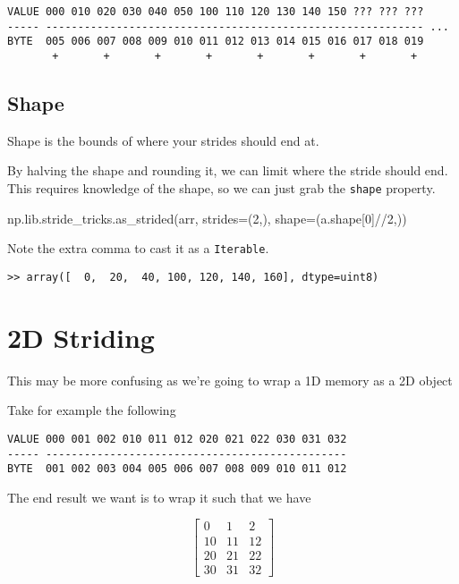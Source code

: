 \documentclass[oneside, 12pt]{report}
\begin{document}
\begin{verbatim}
VALUE 000 010 020 030 040 050 100 110 120 130 140 150 ??? ??? ??? 
----- ----------------------------------------------------------- ...
BYTE  005 006 007 008 009 010 011 012 013 014 015 016 017 018 019
       +       +       +       +       +       +       +       +
\end{verbatim}

\subsection{Shape}

Shape is the bounds of where your strides should end at.

By halving the shape and rounding it, we can limit where the stride should end. This requires knowledge of the shape, so we can just grab the \verb+shape+ property.

\begin{python}
np.lib.stride_tricks.as_strided(arr, strides=(2,), shape=(a.shape[0]//2,))
\end{python}

Note the extra comma to cast it as a \verb+Iterable+.

\begin{verbatim}
>> array([  0,  20,  40, 100, 120, 140, 160], dtype=uint8)
\end{verbatim}

\section{2D Striding}

This may be more confusing as we're going to wrap a 1D memory as a 2D object

Take for example the following

\begin{verbatim}
VALUE 000 001 002 010 011 012 020 021 022 030 031 032
----- -----------------------------------------------
BYTE  001 002 003 004 005 006 007 008 009 010 011 012
\end{verbatim}

The end result we want is to wrap it such that we have

\begin{equation*}
\begin{bmatrix}
0  & 1  & 2 \\
10 & 11 & 12 \\
20 & 21 & 22 \\
30 & 31 & 32
\end{bmatrix}
\end{equation*}
\end{document}
